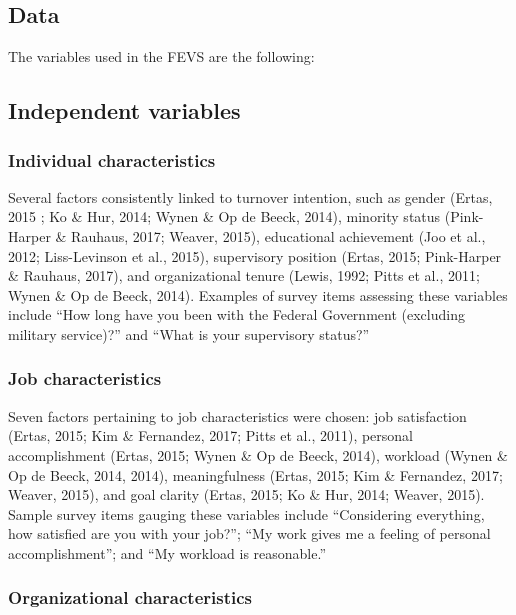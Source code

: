 \documentclass[
  jou]{apa6}
\begin{document}
\hypertarget{data}{%
\subsection{Data}\label{data}}

The variables used in the FEVS are the following:

\hypertarget{independent-variables}{%
\subsection{Independent variables}\label{independent-variables}}

\hypertarget{individual-characteristics}{%
\subsubsection{Individual characteristics}\label{individual-characteristics}}

Several factors consistently linked to turnover intention, such as gender (Ertas, 2015 ; Ko \& Hur, 2014; Wynen \& Op de Beeck, 2014), minority status (Pink-Harper \& Rauhaus, 2017; Weaver, 2015), educational achievement (Joo et al., 2012; Liss-Levinson et al., 2015), supervisory position (Ertas, 2015; Pink-Harper \& Rauhaus, 2017), and organizational tenure (Lewis, 1992; Pitts et al., 2011; Wynen \& Op de Beeck, 2014).
Examples of survey items assessing these variables include ``How long have you been with the Federal Government (excluding military service)?'' and ``What is your supervisory status?''

\hypertarget{job-characteristics}{%
\subsubsection{Job characteristics}\label{job-characteristics}}

Seven factors pertaining to job characteristics were chosen: job satisfaction (Ertas, 2015; Kim \& Fernandez, 2017; Pitts et al., 2011), personal accomplishment (Ertas, 2015; Wynen \& Op de Beeck, 2014), workload (Wynen \& Op de Beeck, 2014, 2014), meaningfulness (Ertas, 2015; Kim \& Fernandez, 2017; Weaver, 2015), and goal clarity (Ertas, 2015; Ko \& Hur, 2014; Weaver, 2015).
Sample survey items gauging these variables include ``Considering everything, how satisfied are you with your job?''; ``My work gives me a feeling of personal accomplishment''; and ``My workload is reasonable.''

\hypertarget{organizational-characteristics}{%
\subsubsection{Organizational characteristics}\label{organizational-characteristics}}
\end{document}
